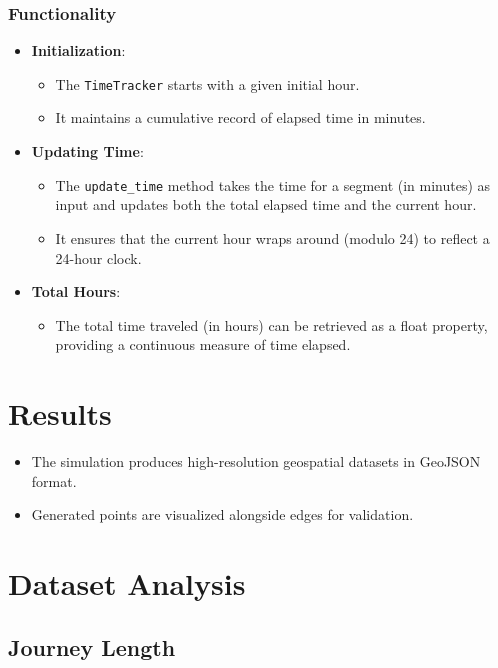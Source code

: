 \documentclass[sigplan,screen]{acmart}
\begin{document}
\subsubsection{Functionality}
\begin{itemize}
    \item \textbf{Initialization}:
    \begin{itemize}
        \item The \texttt{TimeTracker} starts with a given initial hour.
        \item It maintains a cumulative record of elapsed time in minutes.
    \end{itemize}

    \item \textbf{Updating Time}:
    \begin{itemize}
        \item The \texttt{update\_time} method takes the time for a segment (in minutes) as input and updates both the total elapsed time and the current hour.
        \item It ensures that the current hour wraps around (modulo 24) to reflect a 24-hour clock.
    \end{itemize}

    \item \textbf{Total Hours}:
    \begin{itemize}
        \item The total time traveled (in hours) can be retrieved as a float property, providing a continuous measure of time elapsed.
    \end{itemize}
\end{itemize}

\section{Results}
\begin{itemize}
    \item The simulation produces high-resolution geospatial datasets in GeoJSON format.
    \item Generated points are visualized alongside edges for validation.
\end{itemize}


\section{Dataset Analysis}

\subsection{Journey Length}
\end{document}
